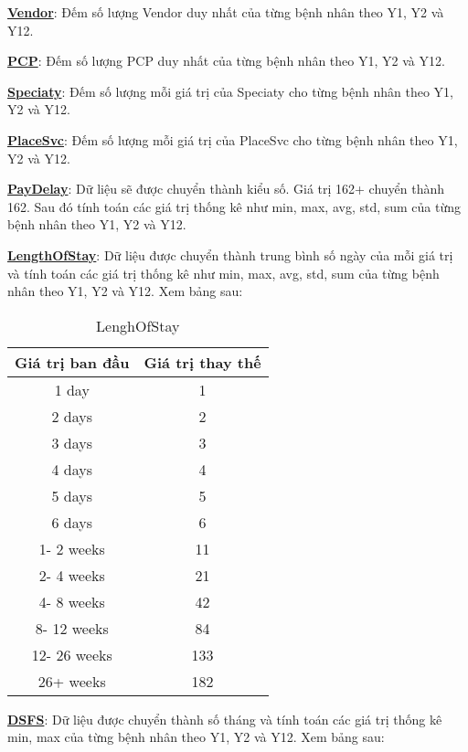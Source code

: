 \textbf{\underline{Vendor}}: Đếm số lượng Vendor duy nhất của từng bệnh nhân theo Y1, Y2 và Y12.

\textbf{\underline{PCP}}: Đếm số lượng PCP duy nhất của từng bệnh nhân theo Y1, Y2 và Y12.

\textbf{\underline{Speciaty}}: Đếm số lượng mỗi giá trị của Speciaty cho từng bệnh nhân theo Y1, Y2 và Y12.

\textbf{\underline{PlaceSvc}}: Đếm số lượng mỗi giá trị của PlaceSvc cho từng bệnh nhân theo Y1, Y2 và Y12.

\textbf{\underline{PayDelay}}: Dữ liệu sẽ được chuyển thành kiểu số. Giá trị 162+ chuyển thành 162. Sau đó tính toán các giá trị thống kê như min, max, avg, std, sum của từng bệnh nhân theo Y1, Y2 và Y12.

\textbf{\underline{LengthOfStay}}: Dữ liệu được chuyển thành trung bình số ngày của mỗi giá trị và tính toán các giá trị thống kê như min, max, avg, std, sum của từng bệnh nhân theo Y1, Y2 và Y12. Xem bảng sau:

\begin{table}[h!]
    \centering
    \begin{tabular}{||c c||} 
     \hline
     Giá trị ban đầu & Giá trị thay thế \\
     \hline\hline
     1 day & 1 \\
     2 days & 2 \\
     3 days & 3 \\
     4 days & 4 \\
     5 days & 5 \\
     6 days & 6 \\
     1- 2 weeks & 11 \\
     2- 4 weeks & 21 \\
     4- 8 weeks & 42 \\
     8- 12 weeks & 84 \\
     12- 26 weeks & 133 \\
     26+ weeks & 182 \\
     \hline
    \end{tabular}
    \caption{LenghOfStay}
    \label{table:1}
\end{table}

\textbf{\underline{DSFS}}: Dữ liệu được chuyển thành số tháng và tính toán các giá trị thống kê min, max của từng bệnh nhân theo Y1, Y2 và Y12. Xem bảng sau:

